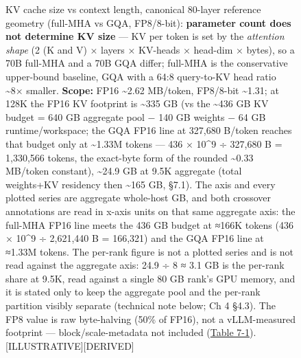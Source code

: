 \begin{figure}
\caption[KV cache size vs context length, canonical 80-layer reference geometry]{KV cache size vs context length, canonical 80-layer reference geometry (full-MHA vs GQA, FP8/8-bit): \textbf{parameter count does not determine KV size} --- KV per token is set by the \emph{attention shape} (2 (K and V) × layers × KV-heads × head-dim × bytes), so a 70B full-MHA and a 70B GQA differ; full-MHA is the conservative upper-bound baseline, GQA with a 64:8 query-to-KV head ratio \textasciitilde8× smaller. \textbf{Scope:} FP16 \textasciitilde2.62 MB/token, FP8/8-bit \textasciitilde1.31; at 128K the FP16 KV footprint is \textasciitilde335 GB (vs the \textasciitilde436 GB KV budget = 640 GB aggregate pool − 140 GB weights − 64 GB runtime/workspace; the GQA FP16 line at 327,680 B/token reaches that budget only at \textasciitilde1.33M tokens --- 436 × 10\^{}9 ÷ 327,680 B = 1,330,566 tokens, the exact-byte form of the rounded \textasciitilde0.33 MB/token constant), \textasciitilde24.9 GB at 9.5K aggregate (total weights+KV residency then \textasciitilde165 GB, §7.1). The axis and every plotted series are aggregate whole-host GB, and both crossover annotations are read in x-axis units on that same aggregate axis: the full-MHA FP16 line meets the 436 GB budget at ≈166K tokens (436 × 10\^{}9 ÷ 2,621,440 B = 166,321) and the GQA FP16 line at ≈1.33M tokens. The per-rank figure is not a plotted series and is not read against the aggregate axis: 24.9 ÷ 8 ≈ 3.1 GB is the per-rank share at 9.5K, read against a single 80 GB rank's GPU memory, and it is stated only to keep the aggregate pool and the per-rank partition visibly separate (technical note below; Ch 4 §4.3). The FP8 value is raw byte-halving (50\% of FP16), not a vLLM-measured footprint --- block/scale-metadata not included (\hyperref[tab:7.1]{Table 7-1}). \mbox{{[}ILLUSTRATIVE{]}}\hspace{0pt}\mbox{{[}DERIVED{]}}}

\label{fig:7.5}\end{figure}


